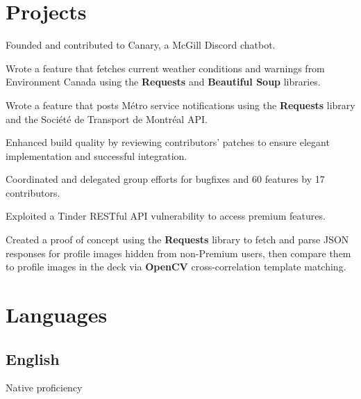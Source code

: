 \documentclass[]{jidicula-resume}
\begin{document}
\section{Projects}

\begin{tightemize}
\item Founded and contributed to Canary, a McGill Discord chatbot.
  \item Wrote a feature that fetches current weather conditions and warnings from Environment Canada using the \textbf{Requests} and \textbf{Beautiful Soup} libraries.
  \item Wrote a feature that posts M\'etro service notifications using the \textbf{Requests} library and the Soci\'et\'e de Transport de Montr\'eal API.
  \item Enhanced build quality by reviewing contributors' patches to ensure elegant implementation and successful integration.
  \item Coordinated and delegated group efforts for bugfixes and 60 features by 17 contributors.
\end{tightemize}
\sectionsep

\begin{tightemize}
\item Exploited a Tinder RESTful API vulnerability to access premium features.
\item Created a proof of concept using the \textbf{Requests} library to fetch and parse JSON responses for profile images hidden from non-Premium users, then compare them to profile images in the deck via \textbf{OpenCV} cross-correlation template matching.
\end{tightemize}
\sectionsep

\section{Languages}
\subsection{English}
Native proficiency
\sectionsep
\end{document}
